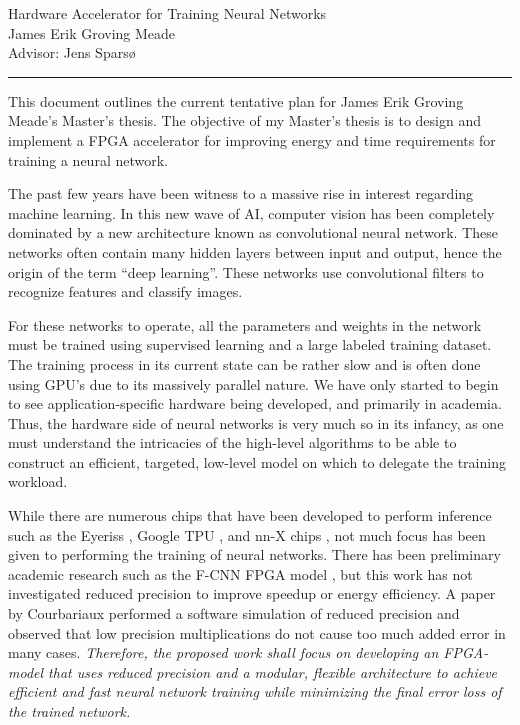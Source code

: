 \documentclass[a4paper]{article}
\begin{document}
	\begin{center}
		\Large {Hardware Accelerator for Training Neural Networks}\\
		\large
		James Erik Groving Meade\\
		Advisor: Jens Sparsø
		\hrule
		\bigskip
	\end{center}
\normalsize 

This document outlines the current tentative plan for James Erik Groving Meade's Master's thesis. The objective of my Master's thesis is to design and implement a FPGA accelerator for improving energy and time requirements for training a neural network.
\par 
The past few years have been witness to a massive rise in interest regarding machine learning. In this new wave of AI, computer vision has been completely dominated by a new architecture known as convolutional neural network. These networks often contain many hidden layers between input and output, hence the origin of the term ``deep learning''. These networks use convolutional filters to recognize features and classify images.
\par 
For these networks to operate, all the parameters and weights in the network must be trained using supervised learning and a large labeled training dataset. The training process in its current state can be rather slow and is often done using GPU's due to its massively parallel nature. We have only started to begin to see application-specific hardware being developed, and primarily in academia. Thus, the hardware side of neural networks is very much so in its infancy, as one must understand the intricacies of the high-level algorithms to be able to construct an efficient, targeted, low-level model on which to delegate the training workload.
\par 
While there are numerous chips that have been developed to perform inference such as the Eyeriss \cite{eyeriss}, Google TPU \cite{tpu}, and nn-X chips \cite{nnx}, not much focus has been given to performing the training of neural networks. There has been preliminary academic research such as the F-CNN FPGA model \cite{fcnn}, but this work has not investigated reduced precision to improve speedup or energy efficiency. A paper by Courbariaux performed a software simulation of reduced precision and observed that low precision multiplications do not cause too much added error in many cases. \emph{Therefore, the proposed work shall focus on developing an FPGA-model that uses reduced precision and a modular, flexible architecture to achieve efficient and fast neural network training while minimizing the final error loss of the trained network.}
\end{document}
